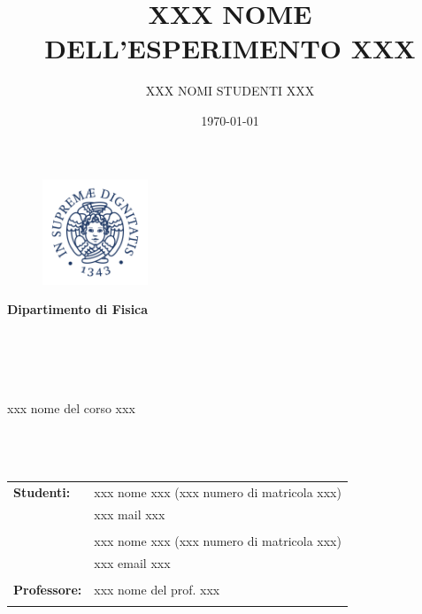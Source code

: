 \documentclass[a4paper,11pt]{article}
\title{XXX NOME DELL'ESPERIMENTO XXX} %
\author{XXX NOMI STUDENTI XXX}
\date{\today}
\begin{document}
	\begin{titlepage}
		\thispagestyle{empty}
		\begin{figure}
			\includegraphics[width=31.5mm,right]{./Cherubino}
		\end{figure}
		\vspace*{-43mm}\hspace{-6mm}\textbf{\textcolor{pantone294}{\large{Dipartimento di Fisica}}}\\\\\\\\\\
		
		\vspace{30mm}
		\begin{center}
			\textcolor{pantone294}{\huge{xxx nome del corso  xxx}}\\\vspace*{7mm} %
			\textcolor{pantone294}{\huge{\textbf{\thetitle}}}\\\vspace*{10mm}
			\textcolor{pantone294}{\theauthor}\\\vspace*{10mm}
			\textcolor{pantone294}{\thedate}\\\vspace*{20mm}
			\begin{tabular}{ll}
				\textbf{Studenti:} & xxx nome xxx (xxx numero di matricola xxx) \\
				& xxx mail xxx\\ \\
				& xxx nome xxx (xxx numero di matricola xxx) \\
				& xxx email xxx \\ \\
				\textbf{Professore:} & xxx nome del prof. xxx \\ \\
				
			\end{tabular}
		\end{center}
	\end{titlepage}
	\makeatother
	\restoregeometry
	\newpage
	
\end{document}
